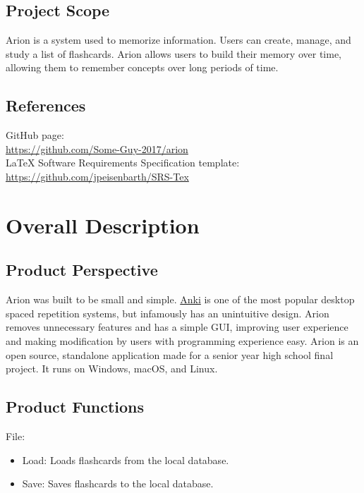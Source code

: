 \documentclass{scrreprt}
\begin{document}
\section{Project Scope}
Arion is a system used to memorize information. Users can create, manage, and study a list of flashcards.
Arion allows users to build their memory over time, allowing them to remember concepts over long periods of time.

\section{References}
\begin{flushleft} 
    GitHub page: \\
    \url{https://github.com/Some-Guy-2017/arion} \\
    LaTeX Software Requirements Specification template: \\
    \url{https://github.com/jpeisenbarth/SRS-Tex} \\
\end{flushleft}


\chapter{Overall Description}

\section{Product Perspective}
Arion was built to be small and simple. \href{https://apps.ankiweb.net/}{Anki} is one of the most popular desktop
spaced repetition systems, but infamously has an unintuitive design.
Arion removes unnecessary features and has a simple GUI, improving user experience and making modification by users
with programming experience easy.
Arion is an open source, standalone application made for a senior year high school final project.
It runs on Windows, macOS, and Linux.

\section{Product Functions}
File:
\begin{itemize}
    \item Load: Loads flashcards from the local database.
    \item Save: Saves flashcards to the local database.
\end{itemize}
\end{document}
